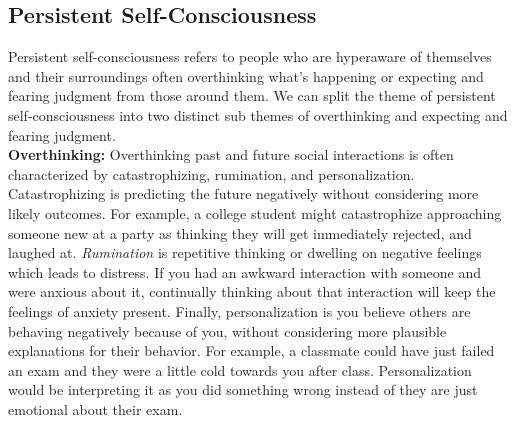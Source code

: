 \documentclass[twoside]{report}
\begin{document}
\subsection{Persistent Self-Consciousness}
Persistent self-consciousness refers to people who are hyperaware of themselves and their surroundings often overthinking what's happening or expecting and fearing judgment from those around them. We can split the theme of persistent self-consciousness into two distinct sub themes of overthinking and expecting and fearing judgment. \cite{lee2022socially} \\

\textbf{Overthinking:} Overthinking past and future social interactions is often characterized by catastrophizing, rumination, and personalization. Catastrophizing is predicting the future negatively without considering more likely outcomes. \cite{lee2022socially} For example, a college student might catastrophize approaching someone new at a party as thinking they will get immediately rejected, and laughed at. \emph{Rumination} is repetitive thinking or dwelling on negative feelings which leads to distress. If you had an awkward interaction with someone and were anxious about it, continually thinking about that interaction will keep the feelings of anxiety present. Finally, personalization is you believe others are behaving negatively because of you, without considering more plausible explanations for their behavior. For example, a classmate could have just failed an exam and they were a little cold towards you after class. Personalization would be interpreting it as you did something wrong instead of they are just emotional about their exam. \\
\end{document}
